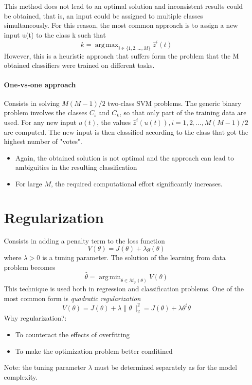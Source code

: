 \documentclass{book}
\DeclareMathOperator*{\argmax}{arg\,max}
\DeclareMathOperator*{\argmin}{arg\,min}
\begin{document}
This method does not lead to an optimal solution and inconsistent results could be obtained, that is, an input could be assigned to multiple classes simultaneously. For this reason, the most common approach is to assign a new input u(t) to the class k such that 
\[
  k=\argmax_{i\in\{1,2,\dots,M\}}\hat{z}^i(t)
\]
However, this is a heuristic approach that suffers form the problem that the M obtained classifiers were trained on different tasks.
\subsubsection{One-vs-one approach}
Consists in solving $M(M - 1)/2$ two-class SVM problems.
The generic binary problem involves the classes $C_i$ and $C_k$, so that only part of the training data are used.
For any new input $u(t)$, the values $\hat{z}^i(u(t)), i = 1,2,...,M(M - 1)/2$ are computed.
The new input is then classified according to the class that got the highest number of "votes".
\begin{itemize}
  \item Again, the obtained solution is not optimal and the approach can lead to ambiguities in the resulting classification
  \item For large $M$, the required computational effort significantly increases.
\end{itemize}

\chapter{Regularization}
Consists in adding a penalty term to the loss function 
\[
  V(\theta)=J(\theta)+\lambda g(\theta)
\]
where $\lambda>0$ is a tuning parameter. The solution of the learning from data problem becomes 
\[
  \hat{\theta}=\argmin_{\theta\in\mathcal{M}_p(\theta)}V(\theta)
\]
This technique is used both in regression and classification problems. One of the most common form is \emph{quadratic regularization}
\[
  V(\theta)=J(\theta)+\lambda\|\theta\|_2^2=J(\theta)+\lambda\theta^t\theta
\]
Why regularization?: 
\begin{itemize}
  \item To counteract the effects of overfitting 
  \item To make the optimization problem better conditined
\end{itemize}
Note: the tuning parameter $\lambda$ must be determined separately as for the model complexity.
\end{document}
